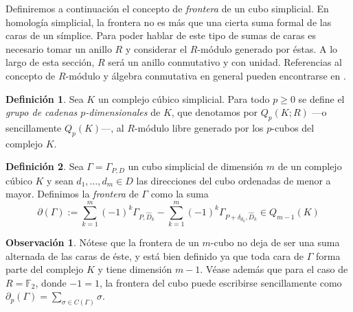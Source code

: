 \documentclass[12pt,a4paper,twoside]{article} %
\theoremstyle{plain}
\theoremstyle{definition}
\newtheorem{definicion}{Definición}[subsection]
\newtheorem{observacion}{Observación}[subsection]
\begin{document}
Definiremos a continuación el concepto de \emph{frontera} de un cubo simplicial. En homología simplicial, la frontera no es más que una cierta suma formal de las caras de un símplice. Para poder hablar de este tipo de sumas de caras es necesario tomar un anillo $R$ y considerar el $R$-módulo generado por éstas. A lo largo de esta sección, $R$ será un anillo conmutativo y con unidad. Referencias al concepto de $R$-módulo y álgebra conmutativa en general pueden encontrarse en \cite{Atiyah}.

\begin{definicion}
Sea $K$ un complejo cúbico simplicial. Para todo $p\geq0$ se define el \emph{grupo de cadenas $p$-dimensionales} de $K$, que denotamos por $Q_p(K; R)$ ---o sencillamente $Q_p(K)$---, al $R$-módulo libre generado por los $p$-cubos del complejo $K$.
\end{definicion}

\begin{definicion}
Sea $\Gamma = \Gamma_{P,D}$ un cubo simplicial de dimensión $m$ de un complejo cúbico $K$ y sean $d_1,\dots,d_m \in D$ las direcciones del cubo ordenadas de menor a mayor. Definimos la \emph{frontera} de $\Gamma$ como la suma
$$ \partial(\Gamma) :=  \sum_{k=1}^m (-1)^{k}\Gamma_{P,\hat{D}_k} - \sum_{k=1}^m (-1)^{k}\Gamma_{P+\delta_{d_k},\hat{D}_k} \in Q_{m-1}(K)$$
\end{definicion}

\begin{observacion}
Nótese que la frontera de un $m$-cubo no deja de ser una suma alternada de las caras de éste, y está bien definido ya que toda cara de $\Gamma$ forma parte del complejo $K$ y tiene dimensión $m-1$. Véase además que para el caso de $R=\mathbb{F}_2$, donde $-1=1$, la frontera del cubo puede escribirse sencillamente como $\partial_p(\Gamma) = \sum_{\sigma\in C(\Gamma)} \sigma$.
\end{observacion}
\end{document}
